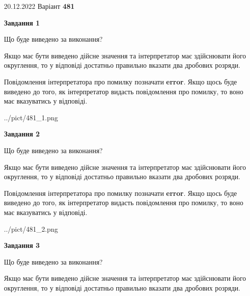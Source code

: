 \documentclass[12pt, ukrainian]{article}
\begin{document}
{20.12.2022 Варіант \No \textbf { 481 }\par}
{
\begin {Large}

{\begin {center}\textbf{Завдання 1}\end {center}}\par
Що буде виведено за виконання? \par

Якщо має бути виведено дійсне значення та інтерпретатор має здійснювати його округлення, 
то у відповіді достатньо правильно вказати два дробових розряди.

Повідомлення інтерпретатора про помилку позначати \textbf{error}.
Якщо щось буде виведено до того, як інтерпретатор видасть повідомлення про помилку, 
то воно має вказуватись у відповіді. \par

\begin{center}
	{../pict/481_1.png}
\end{center}
\newpage

{\begin {center}\textbf{Завдання 2}\end {center}}\par
Що буде виведено за виконання? \par

Якщо має бути виведено дійсне значення та інтерпретатор має здійснювати його округлення, 
то у відповіді достатньо правильно вказати два дробових розряди.

Повідомлення інтерпретатора про помилку позначати \textbf{error}.
Якщо щось буде виведено до того, як інтерпретатор видасть повідомлення про помилку, 
то воно має вказуватись у відповіді. \par

\begin{center}
	{../pict/481_2.png}
\end{center}
\newpage

{\begin {center}\textbf{Завдання 3}\end {center}}\par
Що буде виведено за виконання? \par

Якщо має бути виведено дійсне значення та інтерпретатор має здійснювати його округлення, 
то у відповіді достатньо правильно вказати два дробових розряди.


\end{Large}}
\end{document}
